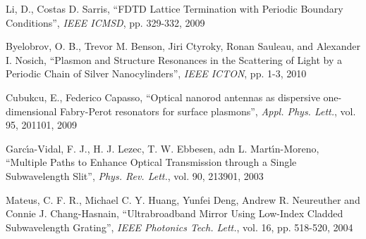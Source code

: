 \begin{thebibliography}{999}
  \bibitem
  {}
  Li, D., Costas D. Sarris,
  ``FDTD Lattice Termination with Periodic Boundary Conditions'',
  \textit{IEEE ICMSD},
  pp. 329-332,
  2009

  \bibitem
  {}
  Byelobrov, O. B., Trevor M. Benson, Jiri Ctyroky, Ronan Sauleau, and Alexander I. Nosich,
  ``Plasmon and Structure Resonances in the Scattering of Light by a Periodic Chain of Silver Nanocylinders'',
  \textit{IEEE ICTON},
  pp. 1-3,
  2010

  \bibitem
  {}
  Cubukcu, E., Federico Capasso,
  ``Optical nanorod antennas as dispersive one-dimensional Fabry-Perot resonators for surface plasmons'',
  \textit{Appl. Phys. Lett.},
  vol. 95,
  201101,
  2009

  \bibitem
  {}
  Garc\'\i{}a-Vidal, F. J., H. J. Lezec, T. W. Ebbesen, adn L. Mart\'\i{}n-Moreno,
  ``Multiple Paths to Enhance Optical Transmission through a Single Subwavelength Slit'',
  \textit{Phys. Rev. Lett.},
  vol. 90,
  213901,
  2003

  \bibitem
  {}
  Mateus, C. F. R., Michael C. Y. Huang, Yunfei Deng, Andrew R. Neureuther and Connie J. Chang-Hasnain,
  ``Ultrabroadband Mirror Using Low-Index Cladded Subwavelength Grating'',
  \textit{IEEE Photonics Tech. Lett.},
  vol. 16,
  pp. 518-520,
  2004

\end{thebibliography}
